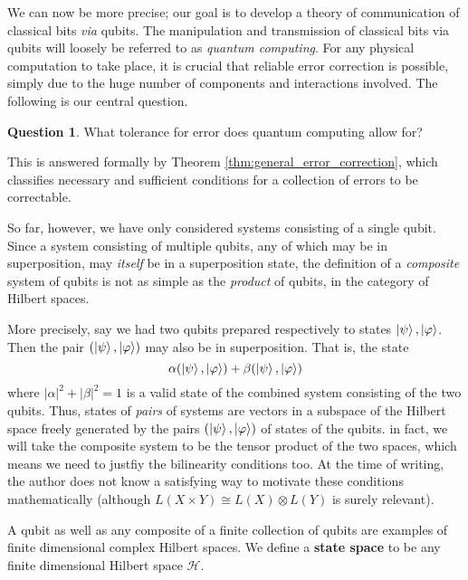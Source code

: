 \documentclass[12pt]{article}
\theoremstyle{plain}
\theoremstyle{definition}
\newtheorem{question}[thm]{Question}
\newcommand{\call}[1]{\mathcal{#1}}
\begin{document}
	We can now be more precise; our goal is to develop a theory of communication of classical bits \emph{via} qubits. The manipulation and transmission of classical bits via qubits will loosely be referred to as \emph{quantum computing}. For any physical computation to take place, it is crucial that reliable error correction is possible, simply due to the huge number of components and interactions involved. The following is our central question.
	\begin{question}\label{question:error_correction}
		What tolerance for error does quantum computing allow for?
		\end{question}
	This is answered formally by Theorem \ref{thm:general_error_correction}, which classifies necessary and sufficient conditions for a collection of errors to be correctable.
	
	So far, however, we have only considered systems consisting of a single qubit. Since a system consisting of multiple qubits, any of which may be in superposition, may \emph{itself} be in a superposition state, the definition of a \emph{composite} system of qubits is not as simple as the \emph{product} of qubits, in the category of Hilbert spaces.
	
	More precisely, say we had two qubits prepared respectively to states $\ket{\psi}, \ket{\varphi}$. Then the pair $(\ket{\psi}, \ket{\varphi})$ may also be in superposition. That is, the state
	\begin{equation}
		\alpha (\ket{\psi}, \ket{\varphi}) + \beta (\ket{\psi}, \ket{\varphi})
		\end{equation}
	where $|\alpha|^2 + |\beta|^2 = 1$ is a valid state of the combined system consisting of the two qubits. Thus, states of \emph{pairs} of systems are vectors in a subspace of the Hilbert space freely generated by the pairs $(\ket{\psi},\ket{\varphi})$ of states of the qubits. in fact, we will take the composite system to be the tensor product of the two spaces, which means we need to justfiy the bilinearity conditions too. At the time of writing, the author does not know a satisfying way to motivate these conditions mathematically (although $L(X \times Y) \cong L(X) \otimes L(Y)$ is surely relevant).
	
	A qubit as well as any composite of a finite collection of qubits are examples of finite dimensional complex Hilbert spaces. We define a \textbf{state space} to be any finite dimensional Hilbert space $\call{H}$.
	
\end{document}
